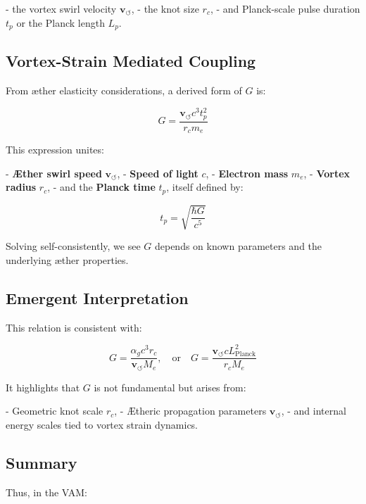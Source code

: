 \documentclass[12pt]{article}
\begin{document}
- the vortex swirl velocity \( \mathbf{v}_{\scriptscriptstyle\boldsymbol{\circlearrowleft}} \),
- the knot size \( r_c \),
- and Planck-scale pulse duration \( t_p \) or the Planck length \( L_p \).

\subsection*{Vortex-Strain Mediated Coupling}

From æther elasticity considerations, a derived form of \( G \) is:

\begin{equation}
    G = \frac{\mathbf{v}_{\scriptscriptstyle\boldsymbol{\circlearrowleft}} c^3 t_p^2}{r_c m_e}
\end{equation}

This expression unites:

- \textbf{Æther swirl speed} \( \mathbf{v}_{\scriptscriptstyle\boldsymbol{\circlearrowleft}} \),
- \textbf{Speed of light} \( c \),
- \textbf{Electron mass} \( m_e \),
- \textbf{Vortex radius} \( r_c \),
- and the \textbf{Planck time} \( t_p \), itself defined by:

\[
    t_p = \sqrt{\frac{\hbar G}{c^5}}
\]

Solving self-consistently, we see \( G \) depends on known parameters and the underlying æther properties.

\subsection*{Emergent Interpretation}

This relation is consistent with:

\[
    G = \frac{\alpha_g c^3 r_c}{\mathbf{v}_{\scriptscriptstyle\boldsymbol{\circlearrowleft}} M_e}, \quad \text{or} \quad G = \frac{\mathbf{v}_{\scriptscriptstyle\boldsymbol{\circlearrowleft}} c L_{\text{Planck}}^2}{r_c M_e}
\]

It highlights that \( G \) is not fundamental but arises from:

- Geometric knot scale \( r_c \),
- Ætheric propagation parameters \( \mathbf{v}_{\scriptscriptstyle\boldsymbol{\circlearrowleft}} \),
- and internal energy scales tied to vortex strain dynamics.

\subsection*{Summary}

Thus, in the VAM:
\end{document}
